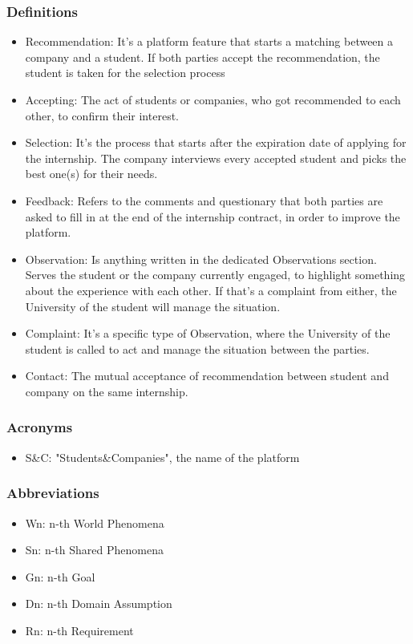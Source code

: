 \documentclass{article}
\begin{document}
\subsubsection{Definitions}
    \begin{itemize}
        \item Recommendation: It's a platform feature that starts a matching between a company and a student. If both parties accept the recommendation, the student is taken for the selection process
        \item Accepting: The act of students or companies, who got recommended to each other, to confirm their interest. 
        \item Selection: It's the process that starts after the expiration date of applying for the internship. The company interviews every accepted student and picks the best one(s) for their needs. 
        \item Feedback: Refers to the comments and questionary that both parties are asked to fill in at the end of the internship contract, in order to improve the platform.
        \item Observation: Is anything written in the dedicated Observations section. Serves the student or the company currently engaged, to highlight something about the experience with each other. If that's a complaint from either, the University of the student will manage the situation.
        \item Complaint: It's a specific type of Observation, where the University of the student is called to act and manage the situation between the parties.
        \item Contact: The mutual acceptance of recommendation between student and company on the same internship.
    \end{itemize}
\subsubsection{Acronyms}
    \begin{itemize}
        \item S\&C: "Students\&Companies", the name of the platform
    \end{itemize}
\subsubsection{Abbreviations}
    \begin{itemize}
        \item Wn: n-th World Phenomena
        \item Sn: n-th Shared Phenomena
        \item Gn: n-th Goal
        \item Dn: n-th Domain Assumption
        \item Rn: n-th Requirement
    \end{itemize}
\end{document}
